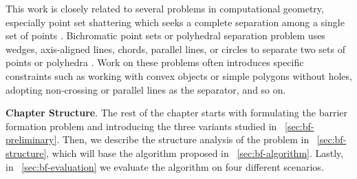 This work is closely related to several problems in computational geometry, especially point set shattering which seeks a complete separation among a single set of points \cite{freimer1991complexity, har2020separating}. 
Bichromatic point sets or polyhedral separation problem uses wedges, axis-aligned lines, chords, parallel lines, or circles to separate two sets of points or polyhedra \cite{devillers2001separating,armaselu2017geometric,boissonnat2001circular, demaine2005separating}. 
Work on these problems often introduces specific constraints such as working with convex objects or simple polygons without holes, adopting non-crossing or parallel lines as the separator, and so on. 

\noindent \textbf{Chapter Structure}.
The rest of the chapter starts with formulating the barrier formation problem and 
introducing the three variants studied in ~\ref{sec:bf-preliminary}. 
Then, we describe the structure analysis of the problem in ~\ref{sec:bf-structure}, which will base the algorithm
proposed in ~\ref{sec:bf-algorithm}. Lastly, in ~\ref{sec:bf-evaluation} we evaluate the algorithm on four different scenarios. %



